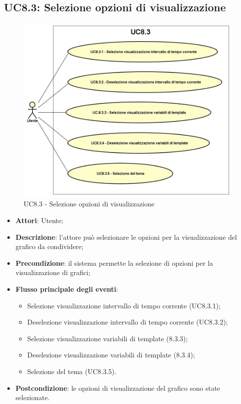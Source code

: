 \subsection{UC8.3: Selezione opzioni di visualizzazione}
\hypertarget{UC8.3}{}
\begin{figure} [H]
	\centering
	\includegraphics[scale=0.45]{Img/UC8-3}
	\caption{UC8.3 - Selezione opzioni di visualizzazione}\label{}
\end{figure}
\begin{itemize}
	\item \textbf{Attori}: Utente;
	\item \textbf{Descrizione}: l'attore può selezionare le opzioni per la visualizzazione del grafico da condividere;
	\item \textbf{Precondizione}: il sistema permette la selezione di opzioni per la visualizzazione di grafici;
	\item \textbf{Flusso principale degli eventi}:
	\begin{itemize}
		\item Selezione visualizzazione intervallo di tempo corrente (UC8.3.1);
		\item Deselezione visualizzazione intervallo di tempo corrente (UC8.3.2);
		\item Selezione visualizzazione variabili di template (8.3.3);
		\item Deselezione visualizzazione variabili di template (8.3.4);
		\item Selezione del tema (UC8.3.5).
	\end{itemize}
	\item \textbf{Postcondizione}: le opzioni di visualizzazione del grafico sono state selezionate.
\end{itemize}

